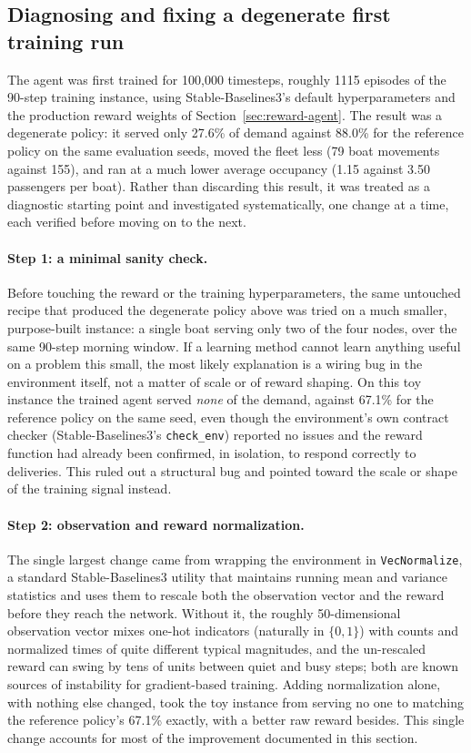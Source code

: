 \documentclass[11pt,a4paper]{article}
\begin{document}
\subsection{Diagnosing and fixing a degenerate first training run}
\label{sec:diagnostico}

The agent was first trained for 100{,}000 timesteps, roughly 1115 episodes of the 90-step training instance, using Stable-Baselines3's default hyperparameters and the production reward weights of Section~\ref{sec:reward-agent}. The result was a degenerate policy: it served only 27.6\% of demand against 88.0\% for the reference policy on the same evaluation seeds, moved the fleet less (79 boat movements against 155), and ran at a much lower average occupancy (1.15 against 3.50 passengers per boat). Rather than discarding this result, it was treated as a diagnostic starting point and investigated systematically, one change at a time, each verified before moving on to the next.

\paragraph{Step 1: a minimal sanity check.} Before touching the reward or the training hyperparameters, the same untouched recipe that produced the degenerate policy above was tried on a much smaller, purpose-built instance: a single boat serving only two of the four nodes, over the same 90-step morning window. If a learning method cannot learn anything useful on a problem this small, the most likely explanation is a wiring bug in the environment itself, not a matter of scale or of reward shaping. On this toy instance the trained agent served \emph{none} of the demand, against 67.1\% for the reference policy on the same seed, even though the environment's own contract checker (Stable-Baselines3's \texttt{check\_env}) reported no issues and the reward function had already been confirmed, in isolation, to respond correctly to deliveries. This ruled out a structural bug and pointed toward the scale or shape of the training signal instead.

\paragraph{Step 2: observation and reward normalization.} The single largest change came from wrapping the environment in \texttt{VecNormalize}, a standard Stable-Baselines3 utility that maintains running mean and variance statistics and uses them to rescale both the observation vector and the reward before they reach the network. Without it, the roughly 50-dimensional observation vector mixes one-hot indicators (naturally in $\{0,1\}$) with counts and normalized times of quite different typical magnitudes, and the un-rescaled reward can swing by tens of units between quiet and busy steps; both are known sources of instability for gradient-based training. Adding normalization alone, with nothing else changed, took the toy instance from serving no one to matching the reference policy's 67.1\% exactly, with a better raw reward besides. This single change accounts for most of the improvement documented in this section.
\end{document}

